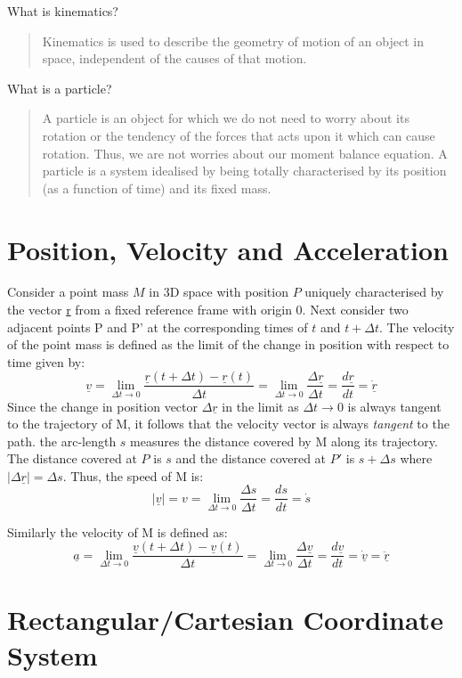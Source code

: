 \documentclass[class=report, crop=false, 12pt,a4paper]{standalone}
\begin{document}
What is kinematics?
\begin{quote}
  \begin{center}
    Kinematics is used to describe the geometry of motion of an object in space, independent of the causes of that motion.
  \end{center}
\end{quote}

What is a particle?
\begin{quote}
  \begin{center}
    A particle is an object for which we do not need to worry about its rotation or the tendency of the forces that acts upon it which can cause rotation. Thus, we are not worries about our moment balance equation. A particle is a system idealised by being totally characterised by its position (as a function of time) and its fixed mass.
  \end{center}
\end{quote}

\section{Position, Velocity and Acceleration}
Consider a point mass \(M\) in 3D space with position \(P\) uniquely characterised by the vector \underline{r} from a fixed reference frame with origin 0. Next consider two adjacent points P and P' at the corresponding times of \(t\) and \(t + \Delta t\). The velocity of the point mass is defined as the limit of the change in position with respect to time given by:
\begin{equation}
  \underline{v} = \lim_{\Delta t \rightarrow 0}\frac{\underline{r}(t+\Delta t) -\underline{r}(t)}{\Delta t} = \lim_{\Delta t \rightarrow 0}\frac{\Delta \underline{r}}{\Delta t} = \frac{d\underline{r}}{dt} = \underline{\dot{r}}
\end{equation}
Since the change in position vector \(\Delta \underline{r}\) in the limit as \(\Delta t \rightarrow 0\) is always tangent to the trajectory of M, it follows that the velocity vector is always \emph{tangent} to the path. the arc-length \(s\) measures the distance covered by M along its trajectory. The distance covered at \(P\) is \(s\) and the distance covered at \(P'\) is \(s + \Delta s\) where \(\left|\Delta \underline{r}\right| = \Delta s\). Thus, the speed of M is:
\begin{equation}
  \left| \underline{v} \right| = v = \lim_{\Delta t \rightarrow 0}\frac{\Delta s}{\Delta t} = \frac{ds}{dt} = \dot{s}
\end{equation} 

Similarly the velocity of M is defined as:
\begin{equation}
  \underline{a} = \lim_{\Delta t \rightarrow 0}\frac{\underline{v}(t+\Delta t) -\underline{v}(t)}{\Delta t} = \lim_{\Delta t \rightarrow 0}\frac{\Delta \underline{v}}{\Delta t} = \frac{d\underline{v}}{dt} = \underline{\dot{v}} = \underline{\ddot{r}}
\end{equation}
\section{Rectangular/Cartesian Coordinate System}
\end{document}

